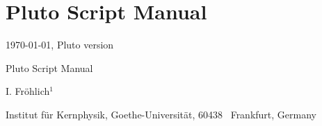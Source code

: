 \documentclass[12pt,twoside]{article}
\newcommand{\s}[1]{\texttt{#1}}
\begin{document}
\section*{Pluto Script Manual}

\today, Pluto version \s{}

\thispagestyle{empty}

\begin{raggedright}


{Pluto Script Manual}

I. Fr\"ohlich$^{1}$

\hspace{-0.4cm}
Institut f\"{u}r Kernphysik, Goethe-Universit\"{a}t, 60438 ~Frankfurt, Germany\\

\end{raggedright}
\vspace{1cm}


\end{document}
